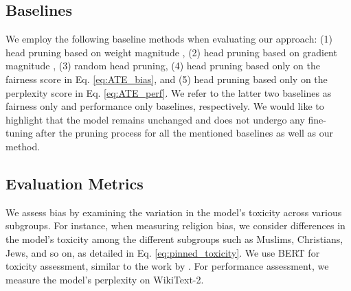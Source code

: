 \documentclass[letterpaper]{article} %
\newcommand{\goncalo}[1]
{\textcolor{orange}{{\bf}{\em #1}{\bf}}}
\begin{document}
\subsection{Baselines}\label{baselines}
We employ the following baseline methods when evaluating our approach: (1) head pruning based on weight magnitude \cite{han2015learning,han2015deep}, (2) head pruning based on gradient magnitude \cite{NEURIPS2019_2c601ad9}, (3) random head pruning, (4) head pruning based only on the fairness score in Eq. \eqref{eq:ATE_bias}, and (5) head pruning based only on the perplexity score in Eq. \eqref{eq:ATE_perf}. %
We refer to the latter two baselines as fairness only and performance only baselines, respectively.
We would like to highlight that the model remains unchanged and does not undergo any fine-tuning after the pruning process for all the mentioned baselines as well as our method.
\subsection{Evaluation Metrics}\label{sec:metrics}
We assess bias by examining the variation in the model's toxicity across various subgroups. For instance, when measuring religion bias, we consider differences in the model's toxicity among the different subgroups such as Muslims, Christians, Jews, and so on, as detailed in Eq. \eqref{eq:pinned_toxicity}. We use BERT for toxicity assessment, similar to the work by \citet{dhamala2021bold}. For performance assessment, we measure the model's perplexity on WikiText-2.
\end{document}
